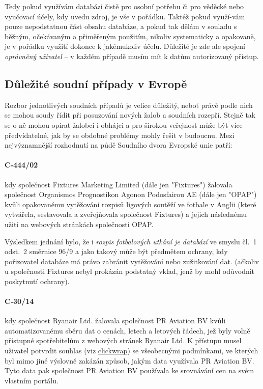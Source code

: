 \documentclass[thesis=B,czech]{FITthesis}[2012/06/26]
\begin{document}
Tedy pokud využívám databázi čistě pro osobní potřebu či pro věděcké nebo vyučovací účely, kdy uvedu zdroj, je vše v pořádku. Taktéž pokud využí-vám pouze nepodstatnou část obsahu databáze, a pokud tak dělám v souladu s běžným, očekávaným a přiměřeným použitím, nikoliv systematicky a opakovaně, je v pořádku využití dokonce k jakémukoliv účelu. Důležité je zde ale spojení \textit{oprávněný uživatel} -- v každém případě musím mít k datům autorizovaný přístup.

\subsection{Důležité soudní případy v Evropě}
Rozbor jednotlivých soudních případů je velice důležitý, neboť právě podle nich se mohou soudy řídit při posuzování nových žalob a soudních rozepří. Stejně tak se o ně mohou opírat žalobci i obhájci a pro širokou veřejnost může být více předvídatelné, jak by se obdobné problémy mohly řešit v budoucnu. Mezi nejvýznamnější rozhodnutí na půdě Soudního dvora Evropské unie patří:

\paragraph{C-444/02} kdy společnost Fixtures Marketing Limited (dále jen "Fixtures") žalovala společnost Organismos Prognostikon Agonon Podosfairou AE (dále jen "OPAP") kvůli opakovanému vytěžování rozpisů ligových soutěží ve fotbale v Anglii (které vytvářela, sestavovala a zveřejňovala společnost Fixtures) a jejich následnému užití na webových stránkách společnosti OPAP.\cite{C-444/02_1}

Výsledkem jednání bylo, že i \emph{rozpis fotbalových utkání je databází} ve smyslu čl.~1 odst.~2 směrnice 96/9 a jako takový může být předmětem ochrany, kdy pořizovatel databáze má právo zabránit vytěžování nebo zužitkování dat. (ačkoliv u společnosti Fixtures nebyl prokázán podstatný vklad, jenž by mohl odůvodnit poskytnutí ochrany).\cite{C-444/02_2}

\paragraph{C‑30/14} kdy společnost Ryanair Ltd. žalovala společnost PR Aviation BV kvůli automatizovanému sběru dat o cenách, letech a letových řádech, jež byly volně přístupné spotřebitelům z webových stránek Ryanair Ltd. K přístupu musel uživatel potvrdit souhlas (viz \hyperref[def:clickwrap]{clickwrap}) se všeobecnými podmínkami, ve kterých byl mimo jiné výslovně zakázán způsob, jakým data využívala PR Aviation BV. Tyto data pak společnost PR Aviation BV používala ke srovnávání cen na svém vlastním portálu.\cite{C-30/14}
\end{document}
